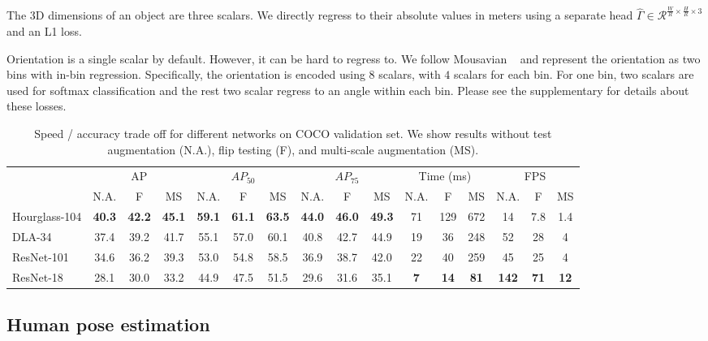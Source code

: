\documentclass[10pt,twocolumn,letterpaper]{article}
\begin{document}
The 3D dimensions of an object are three scalars.
We directly regress to their absolute values in meters using a separate head $\hat \Gamma \in \mathcal{R}^{\frac{W}{R} \times \frac{H}{R} \times 3}$ and an L1 loss.

Orientation is a single scalar by default.
However, it can be hard to regress to.
We follow Mousavian \etal~\cite{mousavian20173d} and represent the orientation as two bins with in-bin regression.
Specifically, the orientation is encoded using $8$ scalars, with $4$ scalars for each bin.
For one bin, two scalars are used for softmax classification and the rest two scalar regress to an angle within each bin.
Please see the supplementary for details about these losses.

\begin{table}[ht]
\centering
\begin{tabular}{l c@{\ \ }c@{\ \ }c @{\qquad} c@{\ \ }c@{\ \ }c @{\qquad} c@{\ \ }c@{\ \ }c @{\qquad} c@{\ \ }c@{\ \ }c @{\qquad} c@{\ \ }c@{\ \ }c}
\hline
 &  \multicolumn{3}{c}{AP} & \multicolumn{3}{c}{$AP_{50}$}  & \multicolumn{3}{c}{$AP_{75}$} & \multicolumn{3}{c}{Time (ms)} & \multicolumn{3}{c}{FPS}\\
 & N.A. & F & MS & N.A. & F & MS & N.A. & F & MS & N.A. & F & MS & N.A. & F & MS\\
\hline
Hourglass-104 & \textbf{40.3} & \textbf{42.2} & \textbf{45.1} & \textbf{59.1} & \textbf{61.1} & \textbf{63.5} & \textbf{44.0} & \textbf{46.0} & \textbf{49.3} & 71 & 129 & 672 & 14 & 7.8 & 1.4\\
DLA-34 & 37.4 & 39.2 & 41.7  & 55.1 & 57.0 & 60.1  & 40.8 & 42.7 & 44.9  & 19 & 36 & 248 & 52 & 28 & 4\\
ResNet-101 & 34.6 & 36.2 & 39.3 & 53.0 & 54.8 & 58.5 & 36.9 & 38.7 & 42.0 & 22 & 40 & 259 & 45 & 25 & 4\\
ResNet-18 & 28.1 & 30.0 & 33.2 & 44.9 & 47.5 & 51.5 & 29.6 & 31.6 & 35.1 & \textbf{7} & \textbf{14} & \textbf{81} & \textbf{142} & \textbf{71} & \textbf{12}\\
\hline
\end{tabular}
\caption{Speed / accuracy trade off for different networks on COCO validation set. We show results without test augmentation (N.A.), flip testing (F), and multi-scale augmentation (MS).}
\label{tab:network}
\vspace{-1em}
\end{table}

\subsection{Human pose estimation}
\end{document}
